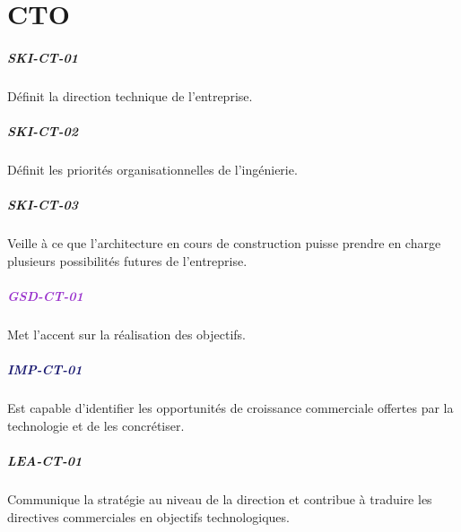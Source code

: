 \documentclass[a4paper, french, openany, 12pt]{book}
\newcommand\dex[1]{\textcolor{BrickRed}{\textbf{\uppercase{ski-{#1}}}}}
\newcommand\str[1]{\textcolor{DarkOrchid}{\textbf{\uppercase{gsd-{#1}}}}}
\newcommand\wis[1]{\textcolor{MidnightBlue}{\textbf{\uppercase{imp-{#1}}}}}
\newcommand\cha[1]{\textcolor{OliveGreen}{\textbf{\uppercase{lea-{#1}}}}}
\begin{document}
\chapter{CTO}

\begin{multicols}{2}

  \paragraph*{\dex{ct-01}}

  Définit la direction technique de l'entreprise.

  \paragraph*{\dex{ct-02}}

  Définit les priorités organisationnelles de l'ingénierie.

  \paragraph*{\dex{ct-03}}

  Veille à ce que l'architecture en cours de construction puisse prendre en charge plusieurs possibilités futures de 
  l'entreprise.

  \paragraph*{\str{ct-01}}

  Met l'accent sur la réalisation des objectifs.

  \paragraph*{\wis{ct-01}}

  Est capable d'identifier les opportunités de croissance commerciale offertes par la technologie et de les concrétiser.

  \paragraph*{\cha{ct-01}}

  Communique la stratégie au niveau de la direction et contribue à traduire les directives commerciales en objectifs 
  technologiques.

\end{multicols}

\backmatter
\end{document}
